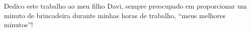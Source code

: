 \vspace*{15cm}

\hfill Dedico este trabalho ao meu filho Davi, sempre preocupado em proporcionar um minuto de brincadeira durante minhas horas de trabalho, ``meus melhores minutos''! \\